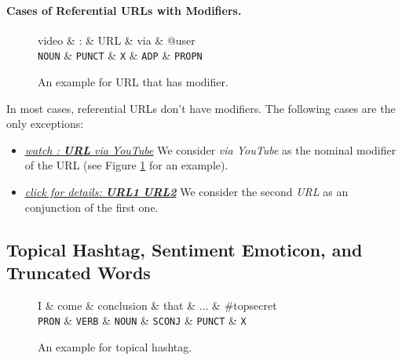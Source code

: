 \documentclass[11pt,a4paper]{article}
\begin{document}
\paragraph{Cases of Referential URLs with Modifiers.}
\begin{figure}[t]
	\centering
	\small
	\begin{dependency}[edge slant=2, text only label, label style=above]
		\begin{deptext}
			video \& : \& URL \& via \& @user \\
			\texttt{NOUN} \& \texttt{PUNCT} \& \texttt{X} \& \texttt{ADP} \& \texttt{PROPN} \\
		\end{deptext}
	\end{dependency}
	\caption{An example for URL that has modifier.}\label{fig:ref-w-mod}
\end{figure}
In most cases, referential URLs don't have modifiers.
The following cases are the only exceptions:
\begin{itemize}
	\item \underline{\textit{watch : \textbf{URL} via YouTube}}
	We consider \textit{via YouTube} as the nominal modifier of the URL
	(see Figure \ref{fig:ref-w-mod} for an example).
	\item \underline{\textit{click for details: \textbf{URL1} \textbf{URL2}}}
	We consider the second \textit{URL} as an conjunction of the first one.
\end{itemize}

\subsection{Topical Hashtag, Sentiment Emoticon, and Truncated Words}

\begin{figure}[t]
	\centering
	\small
	\begin{dependency}[edge slant=2, text only label, label style=above]
		\begin{deptext}
			I \& come \& conclusion \& that \& ... \& \#topsecret \\
			\texttt{PRON} \& \texttt{VERB} \& \texttt{NOUN} \& \texttt{SCONJ} \& \texttt{PUNCT} \& \texttt{X}\\
		\end{deptext}
	\end{dependency}
	\caption{An example for topical hashtag.}\label{fig:hashtag}
\end{figure}
\end{document}
